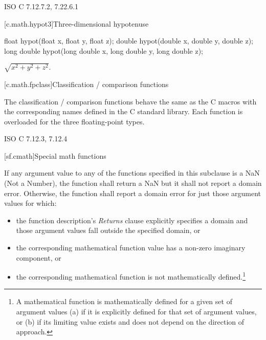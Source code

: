 \xref ISO C 7.12.7.2, 7.22.6.1

[c.math.hypot3]{Three-dimensional hypotenuse}

%
\begin{itemdecl}
float hypot(float x, float y, float z);
double hypot(double x, double y, double z);
long double hypot(long double x, long double y, long double z);
\end{itemdecl}

\begin{itemdescr}
\pnum
\returns $\sqrt{x^2+y^2+z^2} \mbox{.}$
\end{itemdescr}

[c.math.fpclass]{Classification / comparison functions}

\pnum
The classification / comparison functions behave the same as the C macros with the
corresponding names defined in the C standard library.
Each function is overloaded for the three floating-point types.

\xref
ISO C 7.12.3, 7.12.4

[sf.cmath]{Special math functions}%
%

\pnum{}%
If any argument value
to any of the functions specified in this subclause
is a NaN (Not a Number),
the function shall return a NaN
but it shall not report a domain error.
Otherwise,
the function shall report a domain error
for just those argument values
for which:

\begin{itemize}
  \item
  the function description's \emph{Returns} clause
  explicitly specifies a domain
  and those argument values fall
  outside the specified domain,
  or

  \item
  the corresponding mathematical function value
  has a non-zero imaginary component,
  or

  \item
  the corresponding mathematical function
  is not mathematically defined.\footnote{%
    A mathematical function
    is mathematically defined
    for a given set of argument values
    (a)
      if it is explicitly defined
      for that set of argument values,
      or
    (b)
      if its limiting value exists
      and does not depend
      on the direction of approach.}
\end{itemize}

